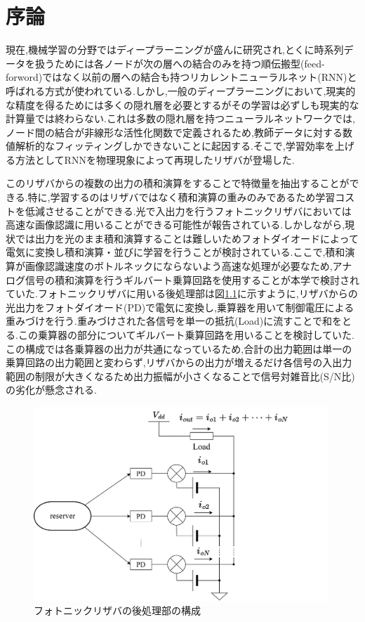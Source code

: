 \chapter{序論}
現在,機械学習の分野ではディープラーニングが盛んに研究され,とくに時系列データを扱うためには各ノードが次の層への結合のみを持つ順伝搬型(feed-forword)ではなく以前の層への結合も持つリカレントニューラルネット(RNN)と呼ばれる方式が使われている.\cite{Reserver}しかし,一般のディープラーニングにおいて,現実的な精度を得るためには多くの隠れ層を必要とするがその学習は必ずしも現実的な計算量では終わらない.これは多数の隠れ層を持つニューラルネットワークでは,ノード間の結合が非線形な活性化関数で定義されるため,教師データに対する数値解析的なフィッティングしかできないことに起因する.そこで,学習効率を上げる方法としてRNNを物理現象によって再現したリザバが登場した.\par
このリザバからの複数の出力の積和演算をすることで特徴量を抽出することができる.特に,学習するのはリザバではなく積和演算の重みのみであるため学習コストを低減させることができる.光で入出力を行うフォトニックリザバにおいては高速な画像認識に用いることができる可能性が報告されている.\cite{Sunada23}しかしながら,現状では出力を光のまま積和演算することは難しいためフォトダイオードによって電気に変換し積和演算・並びに学習を行うことが検討されている.ここで,積和演算が画像認識速度のボトルネックにならないよう高速な処理が必要なため,アナログ信号の積和演算を行うギルバート乗算回路を使用することが本学で検討されていた.フォトニックリザバに用いる後処理部は図\ref{fig:1_config}に示すように,リザバからの光出力をフォトダイオード(PD)で電気に変換し,乗算器を用いて制御電圧による重みづけを行う.重みづけされた各信号を単一の抵抗(Load)に流すことで和をとる.この乗算器の部分についてギルバート乗算回路を用いることを検討していた.この構成では各乗算器の出力が共通になっているため,合計の出力範囲は単一の乗算回路の出力範囲と変わらず,リザバからの出力が増えるだけ各信号の入出力範囲の制限が大きくなるため出力振幅が小さくなることで信号対雑音比(S/N比)の劣化が懸念される.
\begin{figure}
        \begin{center}
        \includegraphics[width=0.99\textwidth]{figures/chapter1/config.pdf}
        \caption{フォトニックリザバの後処理部の構成}
        \label{fig:1_config}
    \end{center}
\end{figure}

